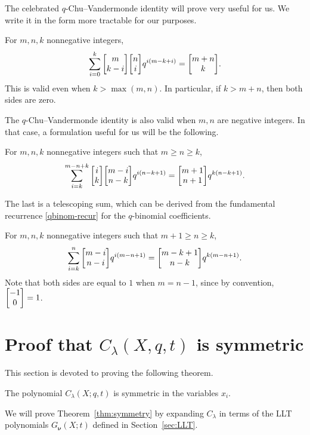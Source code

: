 \documentclass[ALCO,Unicode]{cedram}
\newcommand{\qbinom}[2]{\bgroup\renewcommand*{\arraystretch}{1}\begin{bmatrix} #1 \\ #2\end{bmatrix} \egroup}
\begin{document}
The celebrated $q$-Chu--Vandermonde identity will prove very useful for us. 
We write it in the form more tractable for our purposes.

\begin{theorem}
\label{thm:q-chuvan}
For $m,n,k$ nonnegative integers,
\[
\sum_{i=0}^k \qbinom m{k-i} \qbinom ni q^{i(m-k+i)} = \qbinom {m+n}k.
\]
This is valid even when $k > \max(m,n)$. In particular, if $k > m+n$, then both sides are zero.
\end{theorem}

The $q$-Chu--Vandermonde identity is also valid when $m,n$ are negative
integers. In that case, a formulation useful for us will be the following.

\begin{cor}
\label{cor:q-dualchu}
For $m,n,k$ nonnegative integers such that $m \geq n \geq k$,
\[
\sum_{i=k}^{m-n+k} \qbinom {i}{k} \qbinom {m-i}{n-k} q^{i(n-k+1)} = \qbinom {m+1}{n+1} q^{k(n-k+1)}.
\]
\end{cor}


The last is a telescoping sum, which can be derived from the fundamental 
recurrence \eqref{qbinom-recur} for the $q$-binomial coefficients.

\begin{proposition}
\label{prop:q-telescope}
For $m,n,k$ nonnegative integers such that $m+1 \geq n \geq k$,
\[
\sum_{i=k}^n \qbinom {m-i}{n-i} q^{i(m-n+1)} = \qbinom {m-k+1}{n-k} q^{k(m-n+1)}.
\]
Note that both sides are equal to $1$ when $m = n-1$, since by convention, $\qbinom {-1}0 = 1$.
\end{proposition}


\section{Proof that $C_{\lambda}(X,q,t)$ is symmetric}
\label{sec:sym}

This section is devoted to proving the following theorem.

\begin{theorem}\label{thm:symmetry}
The polynomial $C_{\lambda}(X; q,t)$ is symmetric in the variables $x_i$.
\end{theorem}

We will prove Theorem~\ref{thm:symmetry} by expanding $C_{\lambda}$ in terms of the LLT polynomials $G_{\boldsymbol{\nu}}(X;t)$ 
defined in Section~\ref{sec:LLT}.
\end{document}
